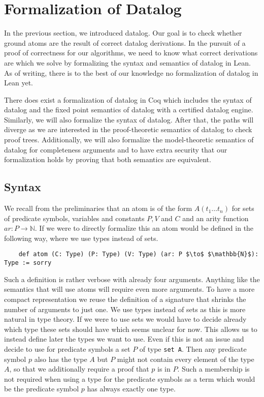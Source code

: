 \section{Formalization of Datalog}\label{sec:formDatalog}
In the previous section, we introduced datalog. Our goal is to check whether ground atoms are the result of correct datalog derivations. In the pursuit of a proof of correctness for our algorithms, we need to know what correct derivations are which we solve by formalizing the syntax and semantics of datalog in Lean. As of writing, there is to the best of our knowledge no formalization of datalog in Lean yet. 

There does exist a formalization of datalog in Coq\cite{datalogCoq} which includes the syntax of datalog and the fixed point semantics of datalog with a certified datalog engine. Similarly, we will also formalize the syntax of datalog. After that, the paths will diverge as we are interested in the proof-theoretic semantics of datalog to check proof trees. Additionally, we will also formalize the model-theoretic semantics of datalog for completeness arguments and to have extra security that our formalization holds by proving that both semantics are equivalent.

\subsection{Syntax}

We recall from the preliminaries that an atom is of the form $A(t_1 \dots t_n)$ for sets of predicate symbols, variables and constants $P, V$ and $C$ and an arity function $ar: P \to \mathbb{N}$. If we were to directly formalize this an atom would be defined in the following way, where we use types instead of sets.

\begin{lstlisting}
    def atom (C: Type) (P: Type) (V: Type) (ar: P $\to$ $\mathbb{N}$): Type := sorry
\end{lstlisting}

Such a definition is rather verbose with already four arguments. Anything like the semantics that will use atoms will require even more arguments. To have a more compact representation we reuse the definition of a signature that shrinks the number of arguments to just one.  We use types instead of sets as this is more natural in type theory. If we were to use sets we would have to decide already which type these sets should have which seems unclear for now. This allows us to instead define later the types we want to use. Even if this is not an issue and decide to use for predicate symbols a set $P$ of type \lstinline|set A|. Then any predicate symbol $p$ also has the type $A$ but $P$ might not contain every element of the type $A$, so that we additionally require a proof that $p$ is in $P$. Such a membership is not required when using a type for the predicate symbols as a term which would be the predicate symbol $p$ has always exactly one type. 


